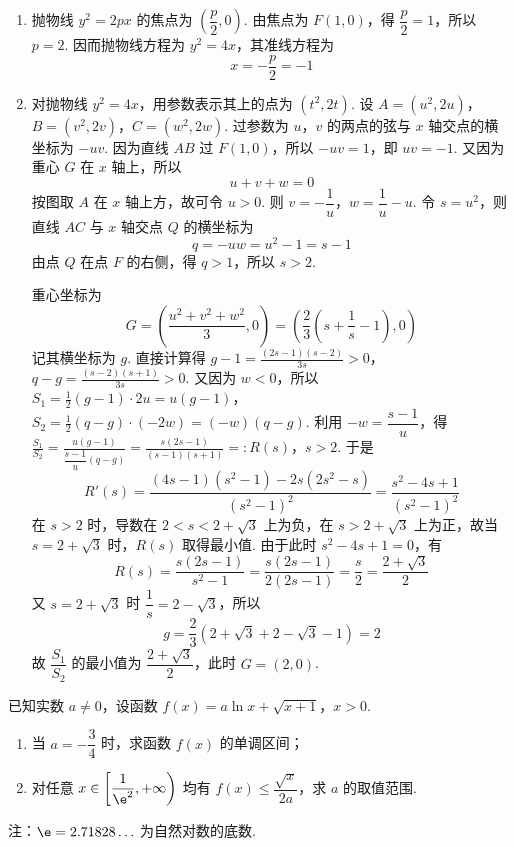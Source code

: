 \begin{solution}
\begin{enumerate}
\item 抛物线 \(y^2=2px\) 的焦点为 \(\left(\dfrac p2,0\right)\). 由焦点为 \(F(1,0)\)，得 \(\dfrac p2=1\)，所以 \(p=2\). 因而抛物线方程为 \(y^2=4x\)，其准线方程为
\[
x=-\frac p2=-1
\]

\item 对抛物线 \(y^2=4x\)，用参数表示其上的点为 \((t^2,2t)\). 设
\(A=(u^2,2u)\)，\(B=(v^2,2v)\)，\(C=(w^2,2w)\).
过参数为 \(u\)，\(v\) 的两点的弦与 \(x\) 轴交点的横坐标为 \(-uv\). 因为直线 \(AB\) 过 \(F(1,0)\)，所以 \(-uv=1\)，即 \(uv=-1\). 又因为重心 \(G\) 在 \(x\) 轴上，所以
\[
u+v+w=0
\]
按图取 \(A\) 在 \(x\) 轴上方，故可令 \(u>0\). 则 \(v=-\dfrac1u\)，\(w=\dfrac1u-u\). 令 \(s=u^2\)，则直线 \(AC\) 与 \(x\) 轴交点 \(Q\) 的横坐标为
\[
q=-uw=u^2-1=s-1
\]
由点 \(Q\) 在点 \(F\) 的右侧，得 \(q>1\)，所以 \(s>2\).

重心坐标为
\[
G=\left(\frac{u^2+v^2+w^2}{3},0\right)=\left(\frac23\left(s+\frac1s-1\right),0\right)
\]
记其横坐标为 \(g\). 直接计算得
\(g-1=\frac{(2s-1)(s-2)}{3s}>0\)，\(q-g=\frac{(s-2)(s+1)}{3s}>0\).
又因为 \(w<0\)，所以
\(S_1=\frac12(g-1)\cdot2u=u(g-1)\)，\(S_2=\frac12(q-g)\cdot(-2w)=(-w)(q-g)\).
利用 \(-w=\dfrac{s-1}{u}\)，得
\(\frac{S_1}{S_2}=\frac{u(g-1)}{\dfrac{s-1}{u}(q-g)}=\frac{s(2s-1)}{(s-1)(s+1)}=:R(s)\)，\(s>2\).
于是
\[
R'(s)=\frac{(4s-1)(s^2-1)-2s(2s^2-s)}{(s^2-1)^2}=\frac{s^2-4s+1}{(s^2-1)^2}
\]
在 \(s>2\) 时，导数在 \(2<s<2+\sqrt3\) 上为负，在 \(s>2+\sqrt3\) 上为正，故当 \(s=2+\sqrt3\) 时，\(R(s)\) 取得最小值. 由于此时 \(s^2-4s+1=0\)，有
\[
R(s)=\frac{s(2s-1)}{s^2-1}=\frac{s(2s-1)}{2(2s-1)}=\frac s2=\frac{2+\sqrt3}{2}
\]
又 \(s=2+\sqrt3\) 时 \(\dfrac1s=2-\sqrt3\)，所以
\[
g=\frac23\left(2+\sqrt3+2-\sqrt3-1\right)=2
\]
故 \(\dfrac{S_1}{S_2}\) 的最小值为 \(\dfrac{2+\sqrt3}{2}\)，此时 \(G=(2,0)\).
\end{enumerate}
\end{solution}

\begin{problem}
已知实数 \(a\neq0\)，设函数 \(f(x)=a\ln x+\sqrt{x+1}\)，\(x>0\).

\begin{enumerate}
  \item 当 \(a=-\dfrac34\) 时，求函数 \(f(x)\) 的单调区间；
  \item 对任意 \(x\in\left[\dfrac{1}{\e^2},+\infty\right)\) 均有 \(f(x)\le\dfrac{\sqrt x}{2a}\)，求 \(a\) 的取值范围.
\end{enumerate}

注：\(\e=2.71828\ldots\) 为自然对数的底数.
\end{problem}

